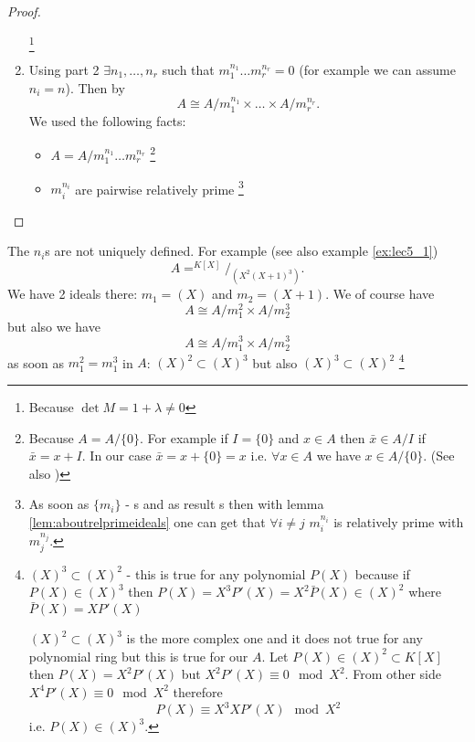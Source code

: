 \begin{theorem}
\begin{proof}
\begin{enumerate}
      \footnote{
        Because $\det M = 1 + \lambda \ne 0$
      }
    \item Using part 2
      $\exists n_1, \dots, n_r$ such that
      $m_1^{n_1} \dots m_r^{n_r} = 0$ (for example we can assume
      $n_i = n$). Then by 
      \[
      A \cong
      A/{m_1^{n_1}} \times \dots \times A/{m_r^{n_r}}.
      \]
      We used the following facts:
      \begin{itemize}
      \item $A = A /m_1^{n_1} \dots m_r^{n_r}$
        \footnote{
          Because $A = A/\{0\}$. For example if $I = \{0\}$ and
          $x \in A$ then $\bar{x} \in A/I$ if $\bar{x} = x + I$. In
          our case $\bar{x} = x + \{0\} = x$ i.e. $\forall x \in A$ we
          have $x \in A/\{0\}$.
          (See also )
        }
      \item $m_i^{n_i}$ are pairwise relatively prime
        \footnote{
          As soon as $\{m_i\}$ - s and as result
          s then with lemma
          \ref{lem:aboutrelprimeideals} one can get that
          $\forall i \ne j$ $m_i^{n_i}$ is relatively prime with
          $m_j^{n_j}$.
        }
      \end{itemize}
    \end{enumerate}
  \end{proof}
  \label{thm:structurefinitekalgebra}
\end{theorem}

\begin{remark}
  The $n_i$s are not uniquely defined. For example (see also example
  \ref{ex:lec5_1}) 
  \[
  A = ^{K\left[X\right]}/_{\left(X^2 \left(X+1\right)^3\right)}.
  \]
  We have 2 ideals there:
  $m_1 = (X)$ and $m_2 = (X+1)$.
  We of course have
  \[
  A \cong A/m_1^2 \times A/m_2^3
  \]
  but also we have
  \[
  A \cong A/m_1^3 \times A/m_2^3
  \]
  as soon as $m_1^2 = m_1^3$ in $A$:
  $(X)^2 \subset (X)^3$ but also
  $(X)^3 \subset (X)^2$
  \footnote{
    $(X)^3 \subset (X)^2$ - this is true for any polynomial
    $P\left(X\right)$ because if
    $P\left(X\right) \in (X)^3$ then
    $P\left(X\right) = X^3 P'\left(X\right) =
    X^2 \bar{P}\left(X\right) \in (X)^2$ where
    $\bar{P}\left(X\right) = X P'\left(X\right)$

    $(X)^2 \subset (X)^3$ is the more complex one and it does not true
    for any polynomial ring but this is true for our $A$.
    Let $P\left(X\right) \in \left(X\right)^2 \subset
    K\left[X\right]$ then
    $P\left(X\right) = X^2 P'\left(X\right)$ but
    $X^2 P'\left(X\right) \equiv 0 \mod X^2$.
    From other side
    $X^4 P'\left(X\right) \equiv 0 \mod X^2$
    therefore
    \[
    P\left(X\right) \equiv X^3 X P'\left(X\right) \mod X^2
    \]
    i.e. $P\left(X\right) \in (X)^3$.
  }
  \label{rem:lec5_4}
\end{remark}

